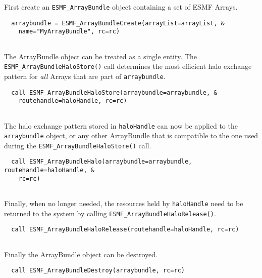    First create an {\tt ESMF\_ArrayBundle} object containing a set of ESMF
   Arrays. 

 \begin{verbatim}
  arraybundle = ESMF_ArrayBundleCreate(arrayList=arrayList, &
    name="MyArrayBundle", rc=rc)
 
\end{verbatim}
 

   The ArrayBundle object can be treated as a single entity. The
   {\tt ESMF\_ArrayBundleHaloStore()} call determines the most efficient
   halo exchange pattern for {\em all} Arrays that are part of
   {\tt arraybundle}. 

 \begin{verbatim}
  call ESMF_ArrayBundleHaloStore(arraybundle=arraybundle, &
    routehandle=haloHandle, rc=rc)
 
\end{verbatim}
 

   The halo exchange pattern stored in {\tt haloHandle} can now be applied to
   the {\tt arraybundle} object, or any other ArrayBundle that is compatible
   to the one used during the {\tt ESMF\_ArrayBundleHaloStore()} call. 

 \begin{verbatim}
  call ESMF_ArrayBundleHalo(arraybundle=arraybundle, routehandle=haloHandle, &
    rc=rc)
 
\end{verbatim}
 

   Finally, when no longer needed, the resources held by {\tt haloHandle} need
   to be returned to the system by calling {\tt ESMF\_ArrayBundleHaloRelease()}. 

 \begin{verbatim}
  call ESMF_ArrayBundleHaloRelease(routehandle=haloHandle, rc=rc)
 
\end{verbatim}
 

   Finally the ArrayBundle object can be destroyed. 

 \begin{verbatim}
  call ESMF_ArrayBundleDestroy(arraybundle, rc=rc)
 
\end{verbatim}

\setlength{\parskip}{\oldparskip}
\setlength{\parindent}{\oldparindent}
\setlength{\baselineskip}{\oldbaselineskip}
